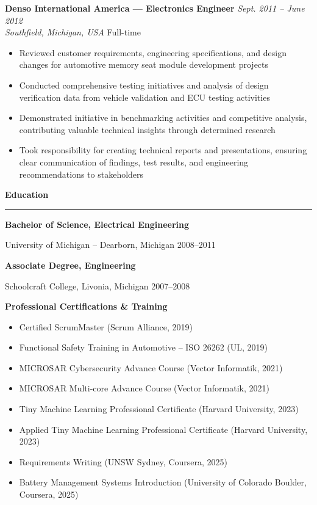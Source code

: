 \documentclass[11pt,letterpaper]{article}
\newcommand{\SectionHeading}[1]{%
  \vspace{0.3cm}
  {\large\bfseries\color{darkblue}#1}
  \vspace{0.1cm}
  \hrule
  \vspace{0.2cm}
}
\newcommand{\SubsectionHeading}[1]{%
  \vspace{0.15cm}
  {\bfseries\color{darkblue}#1}
}
\newcommand{\RoleHeading}[4]{%
  {\bfseries#1} \hfill {\itshape#2}\\
  {\itshape#3} \hfill #4
}
\newenvironment{jobenvironment}[4]{%
  \needspace{2cm}
  \vspace{0.15cm}
  \RoleHeading{#1}{#2}{#3}{#4}
  \vspace{0.05cm}
  \begin{itemize}[leftmargin=0.2in, itemsep=0.05cm, parsep=0cm]
}{%
  \end{itemize}
}
\begin{document}
\begin{jobenvironment}
  {Denso International America — Electronics Engineer}
  {Sept. 2011 -- June 2012}
  {Southfield, Michigan, USA}
  {Full-time}

  \item Reviewed customer requirements, engineering specifications, and design changes for automotive memory seat module development projects
  \item Conducted comprehensive testing initiatives and analysis of design verification data from vehicle validation and ECU testing activities
  \item Demonstrated initiative in benchmarking activities and competitive analysis, contributing valuable technical insights through determined research
  \item Took responsibility for creating technical reports and presentations, ensuring clear communication of findings, test results, and engineering recommendations to stakeholders
\end{jobenvironment}


\SectionHeading{Education}

\SubsectionHeading{Bachelor of Science, Electrical Engineering}
University of Michigan -- Dearborn, Michigan \hfill 2008--2011

\SubsectionHeading{Associate Degree, Engineering}
Schoolcraft College, Livonia, Michigan \hfill 2007--2008

\vspace{0.15cm}

\SubsectionHeading{Professional Certifications \& Training}
\begin{itemize}[leftmargin=0.2in, itemsep=0.05cm, parsep=0cm]
  \item Certified ScrumMaster (Scrum Alliance, 2019)
  \item Functional Safety Training in Automotive -- ISO 26262 (UL, 2019)
  \item MICROSAR Cybersecurity Advance Course (Vector Informatik, 2021)
  \item MICROSAR Multi-core Advance Course (Vector Informatik, 2021)
  \item Tiny Machine Learning Professional Certificate (Harvard University, 2023)
  \item Applied Tiny Machine Learning Professional Certificate (Harvard University, 2023)
  \item Requirements Writing (UNSW Sydney, Coursera, 2025)
  \item Battery Management Systems Introduction (University of Colorado Boulder, Coursera, 2025)
\end{itemize}
\end{document}
